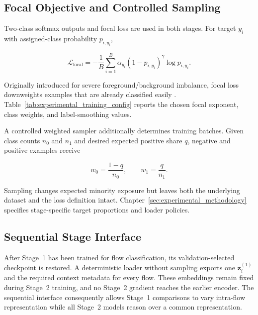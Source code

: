 \documentclass[11pt,fleqn]{report}
\begin{document}
\subsection{Focal Objective and Controlled Sampling}
\label{subsubsec:focal_training}

Two-class softmax outputs and focal loss are used in both stages. For target $y_i$ with assigned-class probability $p_{i,y_i}$,

\begin{equation}
    \mathcal{L}_{\mathrm{focal}}
    =-\frac{1}{B}
      \sum_{i=1}^{B}
      \alpha_{y_i}
      \left(1-p_{i,y_i}\right)^{\gamma}
      \log p_{i,y_i}.
    \label{eq:method_focal_loss}
\end{equation}

Originally introduced for severe foreground/background imbalance, focal loss downweights examples that are already classified easily \cite{Lin2017FocalLoss}. Table~\ref{tab:experimental_training_config} reports the chosen focal exponent, class weights, and label-smoothing values.

A controlled weighted sampler additionally determines training batches. Given class counts $n_0$ and $n_1$ and desired expected positive share $q$, negative and positive examples receive

\begin{equation}
    w_0=\frac{1-q}{n_0},
    \qquad
    w_1=\frac{q}{n_1}.
    \label{eq:controlled_sampler}
\end{equation}

Sampling changes expected minority exposure but leaves both the underlying dataset and the loss definition intact. Chapter~\ref{sec:experimental_methodology} specifies stage-specific target proportions and loader policies.

\subsection{Sequential Stage Interface}
\label{subsec:sequential_stage_interface}

After Stage~1 has been trained for flow classification, its validation-selected checkpoint is restored. A deterministic loader without sampling exports one $\mathbf{z}^{(1)}_i$ and the required context metadata for every flow. These embeddings remain fixed during Stage~2 training, and no Stage~2 gradient reaches the earlier encoder. The sequential interface consequently allows Stage~1 comparisons to vary intra-flow representation while all Stage~2 models reason over a common representation.
\end{document}
